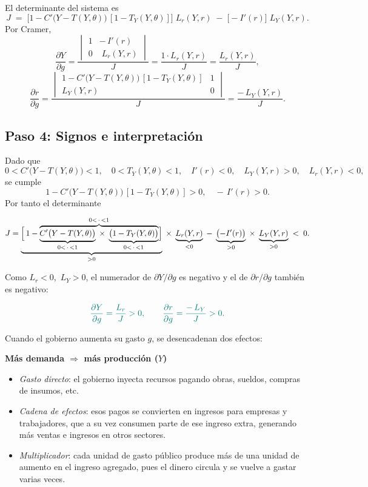 \documentclass{article}
\begin{document}
El determinante del sistema es
\[
J \;=\;
\bigl[1 - C'\bigl(Y - T(Y,\theta)\bigr)\,[1 - T_Y(Y,\theta)]\bigr]\;L_r(Y,r)
\;-\;\bigl[-I'(r)\bigr]\;L_Y(Y,r).
\]
Por Cramer,
\[
\frac{\partial Y}{\partial g}
= \frac{
\begin{vmatrix}
1 & -\,I'(r) \\[4pt]
0 & \;L_r(Y,r)
\end{vmatrix}
}{J}
= \frac{1\cdot L_r(Y,r)}{J}
= \frac{L_r(Y,r)}{J},
\]
\[
\frac{\partial r}{\partial g}
= \frac{
\begin{vmatrix}
1 - C'\bigl(Y - T(Y,\theta)\bigr)\,[1 - T_Y(Y,\theta)] & 1 \\[4pt]
L_Y(Y,r)                                              & 0
\end{vmatrix}
}{J}
= \frac{-\,L_Y(Y,r)}{J}.
\]

\subsection*{Paso 4: Signos e interpretación}

Dado que
\[
0 < C'\bigl(Y - T(Y,\theta)\bigr) < 1,
\quad
0 < T_Y(Y,\theta) < 1,
\quad
I'(r) < 0,
\quad
L_Y(Y,r) > 0,
\quad
L_r(Y,r) < 0,
\]
se cumple
\[
1 - C'\bigl(Y - T(Y,\theta)\bigr)\,[1 - T_Y(Y,\theta)] > 0,
\quad
-\,I'(r) > 0.
\]
Por tanto el determinante

\[
J
= 
\underbrace{\Bigl[\,1 
  - 
  \overbrace{%
    \underbrace{C'\bigl(Y - T(Y,\theta)\bigr)}_{0< \,\cdot\, <1}
    \;\times\;
    \underbrace{\bigl(1 - T_Y(Y,\theta)\bigr)}_{0< \,\cdot\, <1}
  }^{0 < \,\cdot\, < 1}
\Bigr]}_{>0}
\;\times\;
\underbrace{L_r(Y,r)}_{<0}
\;-\;
\underbrace{\bigl(-I'(r)\bigr)}_{>0}
\;\times\;
\underbrace{L_Y(Y,r)}_{>0}
\;<\;0.
\]




Como \(L_r<0\), \(\,L_Y>0\), el numerador de \(\partial Y/\partial g\) es negativo y el de \(\partial r/\partial g\) también es negativo:

\[\color{teal}
\frac{\partial Y}{\partial g}
= \frac{L_r}{J}
>0,
\qquad
\frac{\partial r}{\partial g}
= \frac{-\,L_Y}{J}
>0.
\]


\begin{flushleft}
Cuando el gobierno aumenta su gasto \(g\), se desencadenan dos efectos:
\end{flushleft}
\noindent
\textbf{\color{teal}Más demanda \(\Rightarrow\) más producción (\(Y\))}
\begin{itemize}
  \item \emph{\color{teal}Gasto directo}: el gobierno inyecta recursos pagando obras, sueldos, compras de insumos, etc.
  \item \emph{\color{teal}Cadena de efectos}: esos pagos se convierten en ingresos para empresas y trabajadores, que a su vez consumen parte de ese ingreso extra, generando más ventas e ingresos en otros sectores.
  \item \emph{\color{teal}Multiplicador}: cada unidad de gasto público produce más de una unidad de aumento en el ingreso agregado, pues el dinero circula y se vuelve a gastar varias veces.
\end{itemize}
\end{document}
